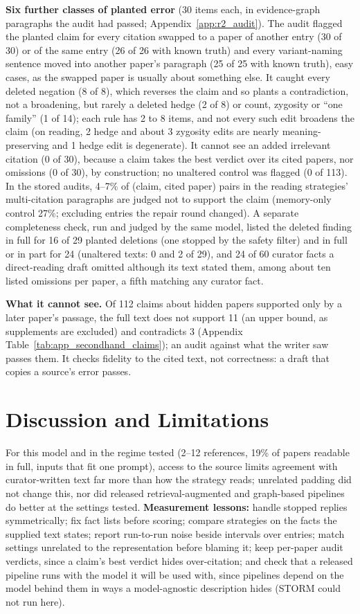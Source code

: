 \documentclass{article} %
\begin{document}
\textbf{Six further classes of planted error} (30 items each, in evidence-graph paragraphs the audit had passed; Appendix~\ref{app:r2_audit}). The audit flagged the planted claim for every citation swapped to a paper of another entry (30 of 30) or of the same entry (26 of 26 with known truth) and every variant-naming sentence moved into another paper's paragraph (25 of 25 with known truth), easy cases, as the swapped paper is usually about something else. It caught every deleted negation (8 of 8), which reverses the claim and so plants a contradiction, not a broadening, but rarely a deleted hedge (2 of 8) or count, zygosity or ``one family'' (1 of 14); each rule has 2 to 8 items, and not every such edit broadens the claim (on reading, 2 hedge and about 3 zygosity edits are nearly meaning-preserving and 1 hedge edit is degenerate). It cannot see an added irrelevant citation (0 of 30), because a claim takes the best verdict over its cited papers, nor omissions (0 of 30), by construction; no unaltered control was flagged (0 of 113). In the stored audits, 4--7\% of (claim, cited paper) pairs in the reading strategies' multi-citation paragraphs are judged not to support the claim (memory-only control 27\%; excluding entries the repair round changed). A separate completeness check, run and judged by the same model, listed the deleted finding in full for 16 of 29 planted deletions (one stopped by the safety filter) and in full or in part for 24 (unaltered texts: 0 and 2 of 29), and 24 of 60 curator facts a direct-reading draft omitted although its text stated them, among about ten listed omissions per paper, a fifth matching any curator fact.

\textbf{What it cannot see.} Of 112 claims about hidden papers supported only by a later paper's passage, the full text does not support 11 (an upper bound, as supplements are excluded) and contradicts 3 (Appendix Table~\ref{tab:app_secondhand_claims}); an audit against what the writer saw passes them. It checks fidelity to the cited text, not correctness: a draft that copies a source's error passes.

\section{Discussion and Limitations}
\label{sec:discussion}
For this model and in the regime tested (2--12 references, 19\% of papers readable in full, inputs that fit one prompt), access to the source limits agreement with curator-written text far more than how the strategy reads; unrelated padding did not change this, nor did released retrieval-augmented and graph-based pipelines do better at the settings tested. \textbf{Measurement lessons:} handle stopped replies symmetrically; fix fact lists before scoring; compare strategies on the facts the supplied text states; report run-to-run noise beside intervals over entries; match settings unrelated to the representation before blaming it; keep per-paper audit verdicts, since a claim's best verdict hides over-citation; and check that a released pipeline runs with the model it will be used with, since pipelines depend on the model behind them in ways a model-agnostic description hides (STORM could not run here).
\end{document}
